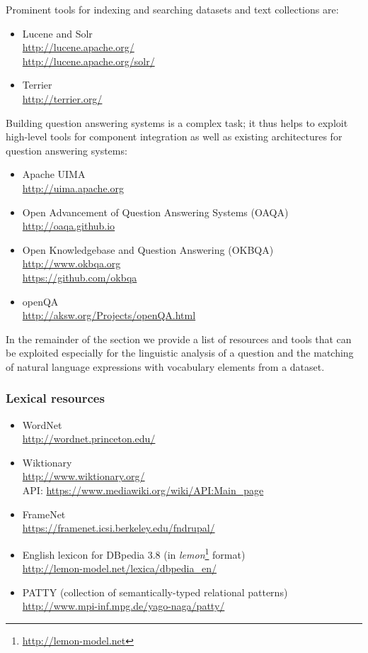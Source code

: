 
Prominent tools for indexing and searching datasets and text collections are:
\begin{itemize}
\item Lucene and Solr \\
      \url{http://lucene.apache.org/} \\
      \url{http://lucene.apache.org/solr/}
\item Terrier \\
      \url{http://terrier.org/}
\end{itemize}

Building question answering systems is a complex task; it thus helps to exploit high-level tools for component integration as well as existing architectures for question answering systems:
\begin{itemize}
\item Apache UIMA \\
\url{http://uima.apache.org}
\item Open Advancement of Question Answering Systems (OAQA) \\
\url{http://oaqa.github.io}
\item Open Knowledgebase and Question Answering (OKBQA) \\
\url{http://www.okbqa.org} \\
\url{https://github.com/okbqa}
\item openQA\\
\url{http://aksw.org/Projects/openQA.html}
\end{itemize}

In the remainder of the section we provide a list of resources and tools that can be exploited especially for the linguistic analysis of a question and the matching of natural language expressions with vocabulary elements from a dataset.

\subsubsection*{Lexical resources}

\begin{itemize}
\item WordNet \\
      \url{http://wordnet.princeton.edu/}
\item Wiktionary \\
      \url{http://www.wiktionary.org/} \\
      API: \url{https://www.mediawiki.org/wiki/API:Main_page}
\item FrameNet \\
      \url{https://framenet.icsi.berkeley.edu/fndrupal/}
\item English lexicon for DBpedia 3.8 (in \emph{lemon}\footnote{\url{http://lemon-model.net}} format) \\
      \url{http://lemon-model.net/lexica/dbpedia_en/}
\item PATTY (collection of semantically-typed relational patterns) \\
      \url{http://www.mpi-inf.mpg.de/yago-naga/patty/}
\end{itemize}

